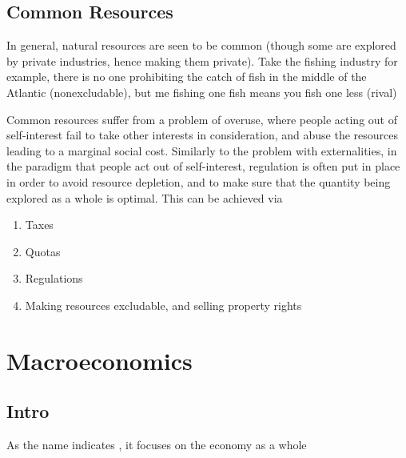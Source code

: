 \documentclass[english,course]{Notes}
\begin{document}
\subsection{Common Resources}


\par{In general, natural resources are seen to be common (though some are explored by private industries, hence making them private). Take the fishing industry for example, there is no one prohibiting the catch of fish in the middle of the Atlantic (nonexcludable), but me fishing one fish means you fish one less (rival)}
\par{Common resources suffer from a problem of overuse, where people acting out of self-interest fail to take other interests in consideration, and abuse the resources leading to a marginal social cost. Similarly to the problem with externalities, in the paradigm that people act out of self-interest, regulation is often put in place in order to avoid resource depletion, and to make sure that the quantity being explored as a whole is optimal. This can be achieved via}

\begin{enumerate}
	\item Taxes
	\item Quotas
	\item Regulations
	\item Making resources excludable, and selling property rights
\end{enumerate}


\section{Macroeconomics}

\subsection{Intro}

\par{As the name indicates , it focuses on the economy as a whole}

\end{document}
